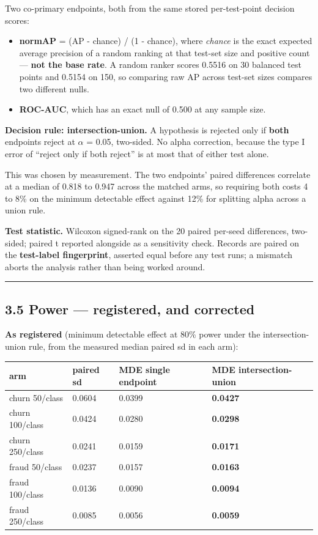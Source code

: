 \documentclass[
  10pt,
]{article}
\newcounter{none} %
\providecommand{\tightlist}{%
  \setlength{\itemsep}{0pt}\setlength{\parskip}{0pt}}
\begin{document}
Two co-primary endpoints, both from the same stored per-test-point
decision scores:

\begin{itemize}
\tightlist
\item
  \textbf{normAP} = (AP - chance) / (1 - chance), where \emph{chance} is
  the exact expected average precision of a random ranking at that
  test-set size and positive count --- \textbf{not the base rate}. A
  random ranker scores 0.5516 on 30 balanced test points and 0.5154 on
  150, so comparing raw AP across test-set sizes compares two different
  nulls.
\item
  \textbf{ROC-AUC}, which has an exact null of 0.500 at any sample size.
\end{itemize}

\textbf{Decision rule: intersection-union.} A hypothesis is rejected
only if \textbf{both} endpoints reject at \(\alpha\) = 0.05, two-sided.
No alpha correction, because the type I error of ``reject only if both
reject'' is at most that of either test alone.

This was chosen by measurement. The two endpoints' paired differences
correlate at a median of 0.818 to 0.947 across the matched arms, so
requiring both costs 4 to 8\% on the minimum detectable effect against
12\% for splitting alpha across a union rule.

\textbf{Test statistic.} Wilcoxon signed-rank on the 20 paired per-seed
differences, two-sided; paired t reported alongside as a sensitivity
check. Records are paired on the \textbf{test-label fingerprint},
asserted equal before any test runs; a mismatch aborts the analysis
rather than being worked around.

\begin{center}\rule{0.5\linewidth}{0.5pt}\end{center}

\subsection{3.5 Power --- registered, and
corrected}\label{power-registered-and-corrected}

\textbf{As registered} (minimum detectable effect at 80\% power under
the intersection-union rule, from the measured median paired sd in each
arm):

{\def\LTcaptype{none} %
\begin{longtable}[]{@{}llll@{}}
\toprule\noalign{}
arm & paired sd & MDE single endpoint & MDE intersection-union \\
\midrule\noalign{}
\endhead
\bottomrule\noalign{}
\endlastfoot
churn 50/class & 0.0604 & 0.0399 & \textbf{0.0427} \\
churn 100/class & 0.0424 & 0.0280 & \textbf{0.0298} \\
churn 250/class & 0.0241 & 0.0159 & \textbf{0.0171} \\
fraud 50/class & 0.0237 & 0.0157 & \textbf{0.0163} \\
fraud 100/class & 0.0136 & 0.0090 & \textbf{0.0094} \\
fraud 250/class & 0.0085 & 0.0056 & \textbf{0.0059} \\
\end{longtable}
}
\end{document}
